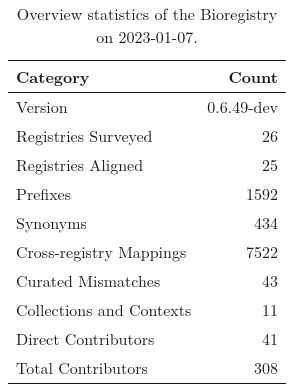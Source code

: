 \begin{table}
\centering
\caption{Overview statistics of the Bioregistry on 2023-01-07.}
\label{tab:bioregistry-summary}
\begin{tabular}{lr}
\toprule
                Category &      Count \\
\midrule
                 Version & 0.6.49-dev \\
     Registries Surveyed &         26 \\
      Registries Aligned &         25 \\
                Prefixes &       1592 \\
                Synonyms &        434 \\
 Cross-registry Mappings &       7522 \\
      Curated Mismatches &         43 \\
Collections and Contexts &         11 \\
     Direct Contributors &         41 \\
      Total Contributors &        308 \\
\bottomrule
\end{tabular}
\end{table}
